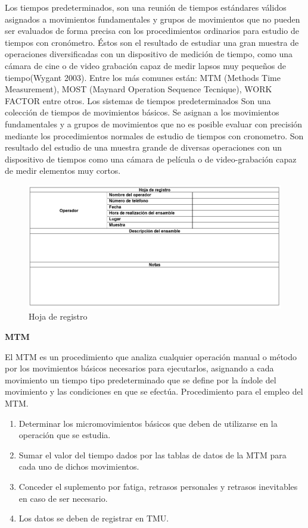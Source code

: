 Los tiempos predeterminados, son una reunión de tiempos estándares válidos asignados a movimientos fundamentales y grupos de movimientos que no pueden ser evaluados de forma precisa con los procedimientos ordinarios para estudio de tiempos con cronómetro. Éstos son el resultado de estudiar una gran muestra de operaciones diversificadas con un dispositivo de medición de tiempo, como una cámara de cine o de video grabación capaz de medir lapsos muy pequeños de tiempo(Wygant 2003). Entre los más comunes están: MTM (Methods Time Measurement), MOST (Maynard Operation Sequence Tecnique), WORK FACTOR entre otros. \cite{Tiempospredeterminados}
\newline
Los sistemas de tiempos predeterminados Son una colección de tiempos de movimientos básicos. Se asignan a los movimientos fundamentales y a grupos de movimientos que no es posible evaluar con precisión mediante los procedimientos normales de estudio de tiempos con cronometro. Son resultado del estudio de una muestra grande de diversas operaciones con un dispositivo de tiempos como una cámara de película o de video-grabación capaz de medir elementos muy cortos. \cite{Sistemadetiempos}


\begin{figure}[H]
        \centering
        \includegraphics[trim = {0mm 0mm 0mm 0mm},clip,scale=0.2]{10/Img/hojaRegistro.png}
        \caption{Hoja de registro}
        \label{hojaRegistro}
\end{figure}

\textbf{MTM}

El MTM es un procedimiento que analiza cualquier operación manual o método por los movimientos básicos necesarios para ejecutarlos, asignando a cada movimiento un tiempo tipo predeterminado que se define por la índole del movimiento y las condiciones en que se efectúa. Procedimiento para el empleo del MTM. \cite{MTM}
\begin{enumerate}
    \item Determinar los micromovimientos básicos que deben de utilizarse en la operación que se estudia.
    \item Sumar el valor del tiempo dados por las tablas de datos de la MTM para cada uno de dichos movimientos.
    \item Conceder el suplemento por fatiga, retrasos personales y retrasos inevitables en caso de ser necesario.
    \item Los datos se deben de registrar en TMU.
\end{enumerate}

